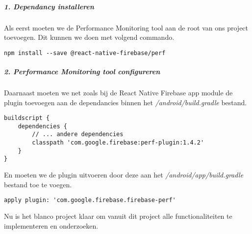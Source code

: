\subparagraph{1. Dependancy installeren}
Als eerst moeten we de Performance Monitoring tool aan de root van ons project toevoegen. 
Dit kunnen we doen met volgend commando.
\begin{verbatim}
npm install --save @react-native-firebase/perf
\end{verbatim}

\subparagraph{2. Performance Monitoring tool configureren}
Daarnaast moeten we net zoals bij de React Native Firebase app module de plugin toevoegen aan 
de dependancies binnen het \textit{/android/build.gradle} bestand. 
\begin{verbatim}
buildscript {
    dependencies {
        // ... andere dependencies
        classpath 'com.google.firebase:perf-plugin:1.4.2'
    }
}
\end{verbatim}
En moeten we de plugin uitvoeren door deze aan het \textit{/android/app/build.gradle} bestand toe te voegen.
\begin{verbatim}
apply plugin: 'com.google.firebase.firebase-perf'
\end{verbatim}
Nu is het blanco project klaar om vanuit dit project alle functionaliteiten te 
implementeren en onderzoeken.